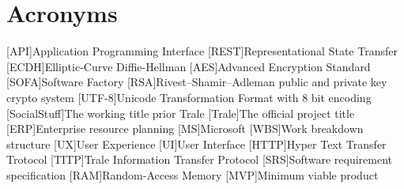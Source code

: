 

\chapter{Acronyms}\label{ch:acronyms}
\begin{acronym}
    [API]{Application Programming Interface}
    [REST]{Representational State Transfer}
    [ECDH]{Elliptic-Curve Diffie-Hellman}
    [AES]{Advanced Encryption Standard}
    [SOFA]{Software Factory}
    [RSA]{Rivest–Shamir–Adleman public and private key crypto system}
    [UTF-8]{Unicode Transformation Format with 8 bit encoding}
    [SocialStuff]{The working title prior Trale}
    [Trale]{The official project title}
    [ERP]{Enterprise resource planning}
    [MS]{Microsoft}
    [WBS]{Work breakdown structure}
    [UX]{User Experience}
    [UI]{User Interface}
    [HTTP]{Hyper Text Transfer Trotocol}
    [TITP]{Trale Information Transfer Protocol}
    [SRS]{Software requirement specification}
    [RAM]{Random-Access Memory}
    [MVP]{Minimum viable product}
\end{acronym}

